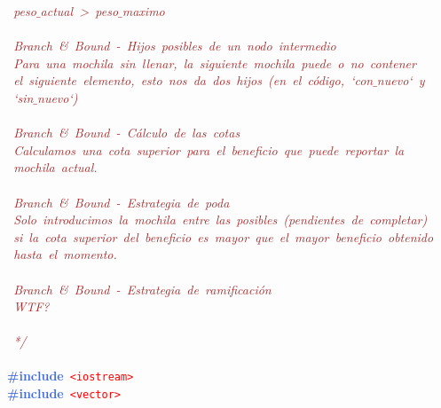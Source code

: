 \mbox{}\textit{\textcolor{Brown}{\ peso$\_$actual\ \textgreater{}\ peso$\_$maximo}} \\
\mbox{} \\
\mbox{}\textit{\textcolor{Brown}{\ Branch\ \&\ Bound\ -\ Hijos\ posibles\ de\ un\ nodo\ intermedio}} \\
\mbox{}\textit{\textcolor{Brown}{\ Para\ una\ mochila\ sin\ llenar,\ la\ siguiente\ mochila\ puede\ o\ no\ contener\ }} \\
\mbox{}\textit{\textcolor{Brown}{\ el\ siguiente\ elemento,\ esto\ nos\ da\ dos\ hijos\ (en\ el\ código,\ `con$\_$nuevo`\ y}} \\
\mbox{}\textit{\textcolor{Brown}{\ `sin$\_$nuevo`)}} \\
\mbox{} \\
\mbox{}\textit{\textcolor{Brown}{\ Branch\ \&\ Bound\ -\ Cálculo\ de\ las\ cotas}} \\
\mbox{}\textit{\textcolor{Brown}{\ Calculamos\ una\ cota\ superior\ para\ el\ beneficio\ que\ puede\ reportar\ la}} \\
\mbox{}\textit{\textcolor{Brown}{\ mochila\ actual.}} \\
\mbox{}\textit{\textcolor{Brown}{\ }} \\
\mbox{}\textit{\textcolor{Brown}{\ Branch\ \&\ Bound\ -\ Estrategia\ de\ poda}} \\
\mbox{}\textit{\textcolor{Brown}{\ Solo\ introducimos\ la\ mochila\ entre\ las\ posibles\ (pendientes\ de\ completar)}} \\
\mbox{}\textit{\textcolor{Brown}{\ si\ la\ cota\ superior\ del\ beneficio\ es\ mayor\ que\ el\ mayor\ beneficio\ obtenido}} \\
\mbox{}\textit{\textcolor{Brown}{\ hasta\ el\ momento.}} \\
\mbox{}\textit{\textcolor{Brown}{\ }} \\
\mbox{}\textit{\textcolor{Brown}{\ Branch\ \&\ Bound\ -\ Estrategia\ de\ ramificación}} \\
\mbox{}\textit{\textcolor{Brown}{\ WTF?}} \\
\mbox{} \\
\mbox{}\textit{\textcolor{Brown}{\ */}} \\
\mbox{} \\
\mbox{}\textbf{\textcolor{RoyalBlue}{\#include}}\ \texttt{\textcolor{Red}{\textless{}iostream\textgreater{}}} \\
\mbox{}\textbf{\textcolor{RoyalBlue}{\#include}}\ \texttt{\textcolor{Red}{\textless{}vector\textgreater{}}} \\

